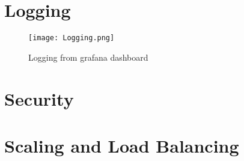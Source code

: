 \section{Logging}

\begin{figure}[H]
    \centering
    \texttt{[image: Logging.png]}
    \caption{Logging from grafana dashboard}
    \label{fig:Minitwit_logging}
\end{figure}

\section{Security}

\section{Scaling and Load Balancing}